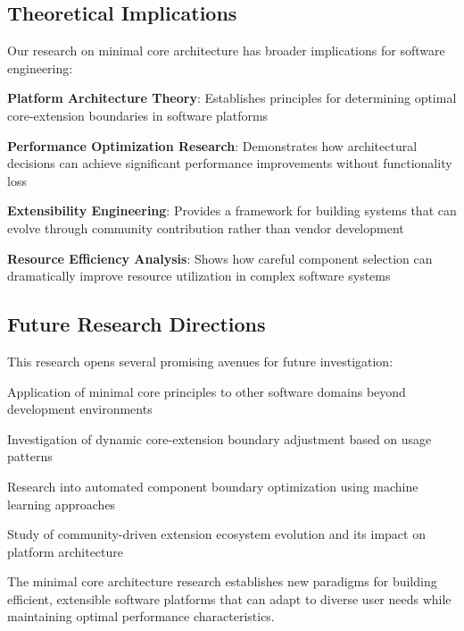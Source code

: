 \subsection*{Theoretical Implications}

Our research on minimal core architecture has broader implications for software engineering:

\begin{expandedlist}
    \item \textbf{Platform Architecture Theory}: Establishes principles for determining optimal core-extension boundaries in software platforms
    \item \textbf{Performance Optimization Research}: Demonstrates how architectural decisions can achieve significant performance improvements without functionality loss
    \item \textbf{Extensibility Engineering}: Provides a framework for building systems that can evolve through community contribution rather than vendor development
    \item \textbf{Resource Efficiency Analysis}: Shows how careful component selection can dramatically improve resource utilization in complex software systems
\end{expandedlist}

\subsection*{Future Research Directions}

This research opens several promising avenues for future investigation:

\begin{compactlist}
    \item Application of minimal core principles to other software domains beyond development environments
    \item Investigation of dynamic core-extension boundary adjustment based on usage patterns
    \item Research into automated component boundary optimization using machine learning approaches
    \item Study of community-driven extension ecosystem evolution and its impact on platform architecture
\end{compactlist}

The minimal core architecture research establishes new paradigms for building efficient, extensible software platforms that can adapt to diverse user needs while maintaining optimal performance characteristics.
